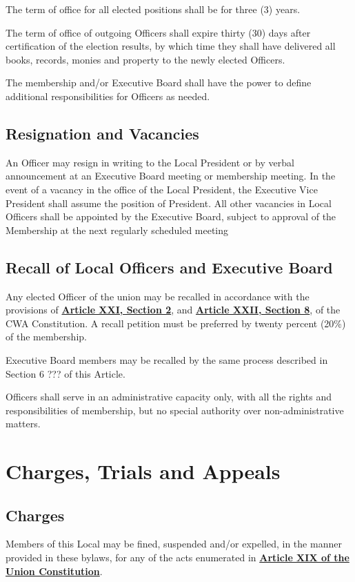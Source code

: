 \documentclass[11pt]{article}
\let\oldhref\href
\renewcommand{\href}[2]{\oldhref{#1}{\bfseries#2}}
\begin{document}
The term of office for all elected positions shall be for three (3) years.

The term of office of outgoing Officers shall expire thirty (30) days after certification of the election results, by which time they shall have delivered all books, records, monies and property to the newly elected Officers.

The membership and/or Executive Board shall have the power to define additional responsibilities for Officers as needed.

\subsection{Resignation and Vacancies}
An Officer may resign in writing to the Local President or by verbal announcement at an Executive Board meeting or membership meeting. In the event of a vacancy in the office of the Local President, the Executive Vice President shall assume the position of President. All other vacancies in Local Officers shall be appointed by the Executive Board, subject to approval of the Membership at the next regularly scheduled meeting

\subsection{Recall of Local Officers and Executive Board}
Any elected Officer of the union may be recalled in accordance with the provisions of \href{https://cwa-union.org/for-locals/cwa-constitution\#A21}{Article XXI, Section 2}, and \href{https://cwa-union.org/for-locals/cwa-constitution\#A22}{Article XXII, Section 8}, of the CWA Constitution. A recall petition must be preferred by twenty percent (20\%) of the membership.

Executive Board members may be recalled by the same process described in Section 6 ??? of this Article.

Officers shall serve in an administrative capacity only, with all the rights and responsibilities of membership, but no special authority over non-administrative matters.

\section{Charges, Trials and Appeals}
\subsection{Charges}
Members of this Local may be fined, suspended and/or expelled, in the manner provided in these bylaws, for any of  the acts enumerated in \href{https://cwa-union.org/for-locals/cwa-constitution\#A19}{Article XIX of the Union Constitution}.
\end{document}
